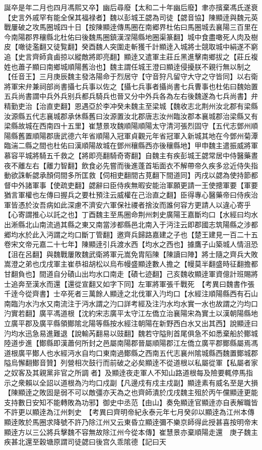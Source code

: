 誕卒是年二月也四月馮熙又卒】幽后尋廢【太和二十年幽后廢】聿亦擯棄馮氏遂衰【史言外戚罕有能全保其福禄者】魏以彭城王勰為司徒【勰音協】陳顯逹與魏元英戰屢破之攻馬圈城四十日【按陳顯逹傳馬圈在南郷界杜佑曰馬圈城去襄陽三百里在今南陽郡界穰縣北杜佑曰後魏馬圈鎮漢涅陽縣地圈渠篆翻】城中食盡噉死人肉及樹皮【噉徒濫翻又徒覧翻】癸酉魏人突圍走斬獲千計顯逹入城將士競取城中絹遂不窮追【史言齊師貪鹵掠以縱敵將即亮翻】顯逹又遣軍主莊丘黑進擊南鄉拔之【莊丘複姓也蕭子顯曰南鄉城順陽舊治也】魏主謂任城王澄曰顯逹侵擾朕不親行無以制之【任音王】三月庚辰魏主發洛陽命于烈居守【守音狩凡留守大守之守皆同】以右衛將軍宋弁兼祠部尚書攝七兵事以佐之【攝七兵事者攝尚書七兵曹事也杜佑曰魏始置五兵尚書謂中兵外兵别兵都兵騎兵也晉又分中外兵各為左右後魏遂為七兵尚書】弁精勤吏治【治直吏翻】恩遇亞於李冲癸未魏主至梁城【魏收志北荆州汝北郡有梁縣汝源縣五代志襄城郡承休縣舊曰汝源置汝北郡唐志汝州臨汝郡本襄城郡治梁縣又有梁縣故城在西南四十五里】崔慧景攻魏順陽順陽太守清河張烈固守【五代志鄧州順陽縣舊置順陽郡唐武德六年省順陽入冠軍貞觀元年省冠軍入新城其地在今鄧州菊潭臨湍二縣之間也杜佑曰漢順陽故城在鄧州穰縣西亦後穰縣地】甲申魏主遣振威將軍慕容平城將騎五千救之【將即亮翻騎奇寄翻】自魏主有疾彭城王勰常居中侍醫藥晝夜不離左右【離力智翻】飲食必先嘗而後進蓬首垢面衣不解帶帝久疾多忿近侍失指動欲誅斬勰承顏伺間多所匡救【伺相吏翻間古莧翻下間道同】丙戌以勰為使持節都督中外諸軍事【使疏吏翻】勰辭曰臣侍疾無暇安能治軍願更請一王使摠軍要【軍要猶言軍權也左傳曰握兵之要杜預注云威權在己治直之翻】臣得專心醫藥帝曰侍疾治軍皆憑於汝吾病如此深慮不濟安六軍保社禝者捨汝而誰何容方更請人以違心寄乎【心寄謂推心以託之也】丁酉魏主至馬圈命荆州刺史廣陽王嘉斷均口【水經曰均水出淅縣北山南流過其縣之東又南當涉都縣邑北南入于沔注云即郡國志筑陽縣之涉都郷均水於此入沔謂之均口斷丁管翻】邀齊兵歸路嘉建之子也【楚王建見一百二十五卷宋文帝元嘉二十七年】陳顯逹引兵渡水西【均水之西也】據鷹子山築城人情沮恐【沮在呂翻】與魏戰屢敗魏武衛將軍元嵩免胄䧟陳【陳讀曰陣】將士隨之齊兵大敗嵩澄之弟也戊戌軍主崔恭祖胡松以烏布幔盛顯逹數人擔之【幔莫半翻盛時征翻擔都甘翻負也】間道自分磧山出均水口南走【磧七迹翻】己亥魏收顯逹軍資億計班賜將士追奔至漢水而還【還從宣翻又如字下同】左軍將軍張千戰死　【考異曰魏書作張千逹今從齊書】士卒死者三萬餘人顯逹之北伐軍入汋均口【水經注順陽縣西有石山南臨汋水汋水又南流注于沔水謂之汋口詳考經及注汋水均水實一水也故謂之汋均口汋實若翻】廣平馮道根【沈約宋志廣平太守江左僑立治襄陽宋為實土以漢朝陽縣地立廣平郡及廣平縣領鄼隂北陽等縣按水經注朝陽在新野西白水又出其西】說顯逹曰汋均水迅急易進難退【說輸芮翻易以豉翻】魏若守隘則首尾俱急不如悉棄船於鄼城陸道步進【鄼縣即漢蕭何所封之邑屬南陽郡晉屬順陽郡江左僑立廣平郡鄼縣屬焉馮道根廣平鄼人也水經沔水自均口東南過鄼縣之西南五代志襄州隂城縣西魏置鄼城郡隘烏懈翻鄼音贊】列營相次鼓行而前破之必矣顯逹不從道根以私屬從軍【私屬者家之奴客及其親黨非官之所調者】及顯逹夜走軍人不知山路道根每及險要輒停馬指示之衆賴以全詔以道根為汋均口戍副【凡邊戍有戍主戍副】顯逹素有威名至是大損【陳顯逹之敗固是弱不可以敵彊亦天為之也齊師潰於戊戌魏主殂於丙午儻顯逹更能支持數日安知不能轉敗為功邪】御史中丞范【由山】奏免顯逹官顯逹亦自表解職皆不許更以顯逹為江州刺史　【考異曰齊明帝紀永泰元年七月癸卯以顯逹為江州本傳顯逹敗於馬圈求降號不許乃除江州又云東昏立顯逹彌不樂京師得此授甚喜按明帝末顯逹方以三公將兵擊魏不容無故除江州今從本傳】崔慧景亦棄順陽走還　庚子魏主疾甚北還至穀塘原謂司徒勰曰後宫久乖隂德【記曰天